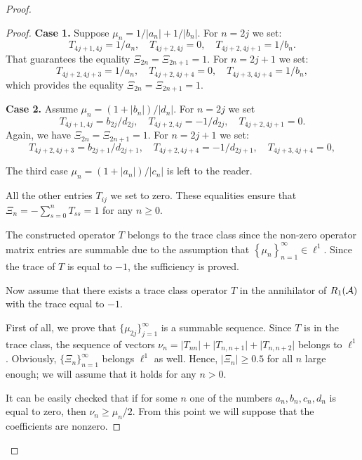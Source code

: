 \begin{proof}
\begin{proof}
        \noindent\textbf{Case 1.}
        Suppose $\mu_n = 1/|a_n| + 1/|b_n|$.
        For $n=2j$ we set:
        \[
          T_{4j+1,4j}=1/a_n, \quad T_{4j+2,4j} = 0, \quad T_{4j+2,4j+1}=1/b_n.
        \]
        That guarantees the equality $\Xi_{2n} = \Xi_{2n+1} = 1$.
        For $n=2j+1$ we set:
        \[
          T_{4j+2,4j+3}=1/a_n, \quad T_{4j+2,4j+4} = 0, \quad T_{4j+3,4j+4}=1/b_n,
        \]
        which provides the equality $\Xi_{2n} = \Xi_{2n+1} = 1$.

        \noindent\textbf{Case 2.}
        Assume $\mu_n = (1 + |b_n|)/|d_n|$.
        For $n=2j$ we set
        \[
          T_{4j+1,4j} = b_{2j}/d_{2j}, \quad T_{4j+2,4j} = -1/d_{2j}, \quad T_{4j+2,4j+1} = 0.
        \]
        Again, we have $\Xi_{2n} = \Xi_{2n+1} = 1$.
        For $n = 2j + 1$ we set:
        \[
          T_{4j+2,4j+3}=b_{2j+1}/d_{2j+1},  \quad T_{4j+2,4j+4} = -1/d_{2j+1}, \quad T_{4j+3,4j+4}=0,
        \]

        The third case $\mu_n = (1 + |a_n|)/|c_n|$ is left to the reader.
        \medskip

        All the other entries $T_{ij}$ we set to zero.
        These equalities ensure that $\Xi_n = -\sum_{s=0}^n T_{ss} = 1$ for any $n \geq 0$.

        The constructed operator $T$ belongs to the trace class since the non-zero operator matrix entries are summable
          due to the assumption that $\left\{\mu_n\right\}_{n=1}^\infty \in \ell^1$.
        Since the trace of $T$ is equal to $-1$, the sufficiency is proved.

        \medskip
        Now assume that there exists a trace class operator $T$ in the annihilator of $R_1(\cal{A})$ with the trace equal to $-1$.

        First of all, we prove that $\{\mu_{2j}\}_{j=1}^\infty$ is a summable sequence.
        Since $T$ is in the trace class, the sequence of vectors $\nu_n = \lvert T_{nn} \rvert + \lvert T_{n, n + 1} \rvert + \lvert T_{n, n+2} \rvert$
          belongs to $\ell^1$.
        Obviously, $\{\Xi_n\}_{n=1}^\infty$ belongs $\ell^1$ as well.
        Hence, $\lvert \Xi_n\rvert \geq 0.5$ for all $n$ large enough; we will assume that it holds for any $n > 0$.

        It can be easily checked that if for some $n$ one of the numbers $a_n,b_n,c_n,d_n$ is equal to zero, then $\nu_n \geq \mu_n/2$.
        From this point we will suppose that the coefficients are nonzero.


\end{proof}
\end{proof}
